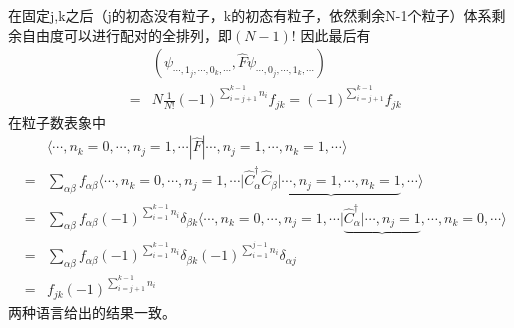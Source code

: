 \documentclass[12pt, a4paper, oneside, UTF8]{ctexbook}
\begin{document}
在固定j,k之后（j的初态没有粒子，k的初态有粒子，依然剩余N-1个粒子）体系剩余自由度可以进行配对的全排列，即$(N-1)!$
因此最后有
\begin{eqnarray}
    &&\left(\psi_{\cdots ,1_j,\cdots,0_k,\cdots},\hat{F}\psi_{\cdots,0_j,\cdots,1_k,\cdots}\right)\\\nonumber
    &=&N \frac{1}{N!}(-1)^{\sum_{i=j+1}^{k-1}n_i}f_{jk}=(-1)^{\sum_{i=j+1}^{k-1}}f_{jk}
\end{eqnarray}
在粒子数表象中
\begin{eqnarray}
    &&\langle\cdots,n_k=0,\cdots,n_j=1,\cdots|\hat{F}|\cdots,n_j=1,\cdots,n_k=1,\cdots\rangle\\\nonumber
    &=&\sum_{\alpha\beta}f_{\alpha\beta}\langle\cdots,n_k=0,\cdots,n_j=1,\cdots|\hat{C}^\dag_\alpha\underbrace{\hat{C}_\beta |\cdots,n_j=1,\cdots,n_k=1},\cdots\rangle\\\nonumber
    &=&\sum_{\alpha\beta}f_{\alpha\beta}(-1)^{\sum_{i=1}^{k-1}n_i}\delta_{\beta k}\langle\cdots,n_k=0,\cdots,n_j=1,\cdots|\underbrace{\hat{C}^\dag_\alpha|\cdots,n_j=1},\cdots,n_k=0,\cdots\rangle\\\nonumber
    &=&\sum_{\alpha\beta}f_{\alpha\beta}(-1)^{\sum_{i=1}^{k-1}n_i}\delta_{\beta k}(-1)^{\sum_{i=1}^{j-1}n_i}\delta_{\alpha j}\\\nonumber
    &=&f_{jk}(-1)^{\sum_{i=j+1}^{k-1}n_i}
\end{eqnarray}
两种语言给出的结果一致。
\end{document}
